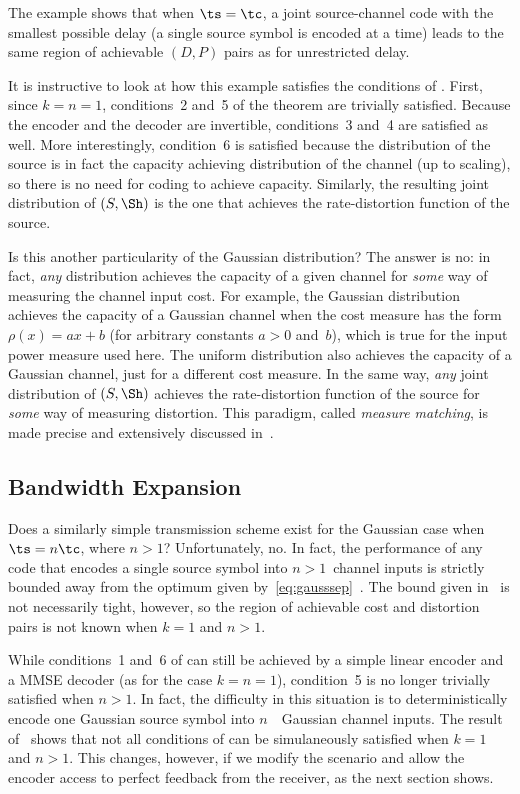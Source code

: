 The example shows that when $\ts = \tc$, a joint source-channel code with the
smallest possible delay (a single source symbol is encoded at a time) leads to
the same region of achievable $(D,P)$ pairs as for unrestricted delay.

It is instructive to look at how this example satisfies the conditions of
. First, since $k = n = 1$, conditions~2 and~5 of
the theorem are trivially satisfied. Because the encoder and the decoder are
invertible, conditions~3 and~4 are satisfied as well. More interestingly,
condition~6 is satisfied because the distribution of the source is in fact the
capacity achieving distribution of the channel (up to scaling), so there is no
need for coding to achieve capacity. Similarly, the resulting joint distribution
of $(S, \Sh)$ is the one that achieves the rate-distortion function of the
source.

Is this another particularity of the Gaussian distribution? The answer is no: in
fact, \emph{any} distribution achieves the capacity of a given channel for
\emph{some} way of measuring the channel input cost. For example, the Gaussian
distribution achieves the capacity of a Gaussian channel when the cost
measure has the form $\rho(x) = ax + b$ (for arbitrary constants $a > 0$
and~$b$), which is true for the input power measure used here. The uniform
distribution also achieves the capacity of a Gaussian channel, just for a
different cost measure. In the same way, \emph{any} joint distribution of $(S,
\Sh)$ achieves the rate-distortion function of the source for \emph{some} way of
measuring distortion. This paradigm, called \emph{measure matching}, is made
precise and extensively discussed in~\cite{GastparRV2003}.


\subsection{Bandwidth Expansion}

Does a similarly simple transmission scheme exist for the Gaussian case when
$\ts = n \tc$, where $n > 1$? Unfortunately, no. In fact, the performance of any
code that encodes a single source symbol into $n>1$~channel inputs is strictly
bounded away from the optimum given by~\eqref{eq:gausssep}~\cite{IngberLZF2008}.
The bound given in~\cite{IngberLZF2008} is not necessarily tight, however, so
the region of achievable cost and distortion pairs is not known when $k = 1$ and
$n > 1$. 

While conditions~1 and~6 of  can still be achieved
by a simple linear encoder and a MMSE decoder (as for the case $k = n = 1$),
condition~5 is no longer trivially satisfied when $n > 1$. In fact, the
difficulty in this situation is to deterministically encode one Gaussian source
symbol into $n$~\iid\ Gaussian channel inputs. The result
of~\cite{IngberLZF2008} shows that not all conditions of
 can be simulaneously satisfied when $k = 1$ and $n
> 1$.  This changes, however, if we modify the scenario and allow the encoder
access to perfect feedback from the receiver, as the next section shows.


